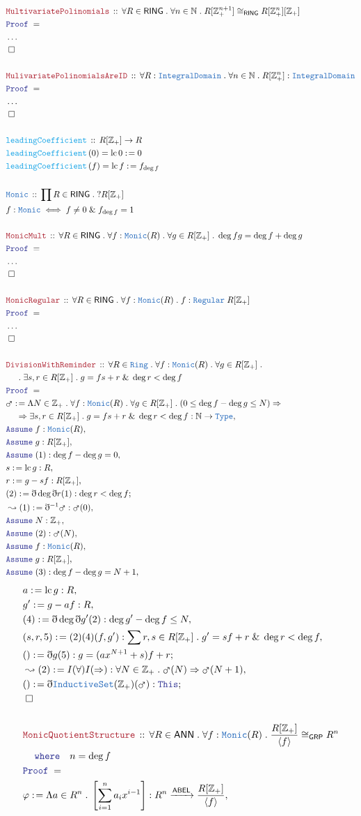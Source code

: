 \documentclass[12pt]{scrartcl}
\newcommand{\TYPE}[1]{\textcolor{NavyBlue}{\mathtt{#1}}}
\newcommand{\FUNC}[1]{\textcolor{Cerulean}{\mathtt{#1}}}
\newcommand{\LOGIC}[1]{\textcolor{Blue}{\mathtt{#1}}}
\newcommand{\THM}[1]{\textcolor{Maroon}{\mathtt{#1}}}
\renewcommand{\.}{\; . \;}
\newcommand{\de}{: \kern 0.1pc =}
\newcommand{\where}{\LOGIC{where}}
\newcommand{\Act}[1]{\left( #1 \right)}
\newcommand{\Theorem}[2]{& \THM{#1} \, :: \, #2 \\ & \Proof = \\ }
\newcommand{\DeclareType}[2]{& \TYPE{#1} \, :: \, #2 \\}
\newcommand{\DefineType}[3]{& #1 : \TYPE{#2} \iff #3 \\}
\newcommand{\DeclareFunc}[2]{& \FUNC{#1} \, :: \, #2 \\}
\newcommand{\DefineNamedFunc}[4]{&  \FUNC{#1}\Act{#2} = #3 \de #4 \\}
\newcommand{\NewLine}{\\ & \kern 1pc}
\newcommand{\Page}[1]{ \begin{align*} #1 \end{align*}   }
\newcommand{ \bd }{ \ByDef }
\newcommand{\NoProof}{ & \ldots \\ \EndProof}
\renewcommand{\And}{\; \& \;}
\newcommand{\Type}{\TYPE{Type}}
\newcommand{\Int}{\mathbb{Z} }
\newcommand{\Nat}{\mathbb{N} }
\newcommand{\Say}[3]{& #1 \de #2 : #3, \\}
\newcommand{\Conclude}[3]{& #1 \de #2 : #3; \\}
\newcommand{\Derive}[3]{& \leadsto #1 \de #2 : #3, \\}
\newcommand{\Assume}[2]{& \LOGIC{Assume} \; #1 : #2, \\}
\newcommand{\QED}{\; \square}
\newcommand{\EndProof}{& \QED \\}
\newcommand{\ByDef}{\eth}
\newcommand{\Proof}{\LOGIC{Proof} \; }
\newcommand{\Arrow}[1]{\xrightarrow{#1}}
\newcommand{\GRP}{\mathsf{GRP}}
\newcommand{\ABEL}{\mathsf{ABEL}}
\newcommand{\Ring}{\TYPE{Ring}}
\newcommand{\ID}{\TYPE{IntegralDomain}}
\newcommand{\RING}{\mathsf{RING}}
\newcommand{\ANN}{\mathsf{ANN}}
\DeclareMathOperator{\lc}{lc}
\begin{document}
\Page{
	\Theorem{MultivariatePolinomials}{\forall R \in \RING \. \forall n \in \Nat \. R[\Int^{n+1}_+] \cong_{\RING} R[\Int^n_+][\Int_+] }
	\NoProof
	\\
	\Theorem{MulivariatePolinomialsAreID}{\forall R : \ID \. \forall n \in \Nat \. R[\Int^n_+] : \ID}
	\NoProof
	\\
	\DeclareFunc{leadingCoefficient}{ R[\Int_+] \to R }
	\DefineNamedFunc{leadingCoefficient}{0}{\lc 0}{ 0  }
	\DefineNamedFunc{leadingCoefficient}{f}{\lc f}{f_{\deg f}}
	\\
	\DeclareType{Monic}{\prod R \in \RING \. ?R[\Int_+]}
	\DefineType{f}{Monic}{f\neq 0 \And f_{\deg f} = 1}
	\\
	\Theorem{MonicMult}{\forall R \in \RING \. \forall f : \TYPE{Monic}(R) \. \forall g \in R[\Int_+] \. \deg fg = \deg f + \deg g}
	\NoProof
	\\
	\Theorem{MonicRegular}{\forall R \in \RING \. \forall f : \TYPE{Monic}(R) \. f : \TYPE{Regular} \; R[\Int_+] }
	\NoProof
	\\
	\Theorem{DivisionWithReminder}{\forall R \in \Ring \. \forall f : \TYPE{Monic}(R) \. \forall g \in R[\Int_+] \.  \NewLine \.\exists s,r \in R[\Int_+] \. g = fs + r \And \deg r < \deg f}
	\Say{\mars}{\Lambda N \in \Int_+ \. \forall  f : \TYPE{Monic}(R) \. \forall g \in R[\Int_+] \.  (0 \le \deg f - \deg g  \le N ) \Rightarrow 
		\NewLine \Rightarrow \exists s,r \in R[\Int_+] \. g = fs + r \And \deg r < \deg f}
	{  \Nat \to \Type  }
	\Assume{f}{\TYPE{Monic}(R)}
	\Assume{g}{R[\Int_+]}
	\Assume{(1)}{ \deg f - \deg g = 0 }
	\Say{s}{\lc g}{R}
	\Say{r}{g - sf}{R[\Int_+]}
	\Conclude{(2)}{\bd \deg \bd r (1)}{ \deg r < \deg f}
	\Derive{(1)}{\bd^{-1}\mars}{\mars(0)}
	\Assume{N}{\Int_+}
	\Assume{(2)}{\mars(N)}
	\Assume{f}{\TYPE{Monic}(R)}
	\Assume{g}{R[\Int_+]}
	\Assume{(3)}{ \deg f - \deg g = N + 1  }
}\Page{
	\Say{a}{\lc g}{R}
	\Say{g'}{g - af}{R}
	\Say{(4)}{\bd \deg \bd g' (2)}{\deg g' - \deg f \le N}
	\Say{(s,r,5)}{ (2)(4)(f,g') }{\sum r,s \in R[\Int_+] \.  g' = sf + r \And \deg r < \deg f}
	\Conclude{()}{\bd g (5)}{  g = (ax^{N+1} +s)f + r    }
	\Derive{(2)}{I(\forall)I(\Rightarrow) }{\forall N \in \Int_+ \. \mars(N) \Rightarrow \mars(N+1)}
	\Conclude{()}{\bd \TYPE{InductiveSet}(\Int_+)(\mars)}{\LOGIC{This}}
	\EndProof
	\\
	\Theorem{MonicQuotientStructure}{\forall R \in \ANN \. \forall f : \TYPE{Monic}(R) \. \frac{R[\Int_+]}{\langle f \rangle} \cong_{\GRP} R^n  \NewLine \where \quad n = \deg f}
	\Say{\varphi}{\Lambda a \in R^n \. \left[\sum^n_{i=1} a_{i}x^{i-1} \right] }{ R^n \Arrow{\ABEL} \frac{R[\Int_+]}{\langle f \rangle}}
}
\end{document}

